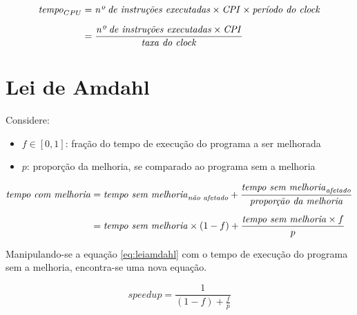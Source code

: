 \documentclass[12pt]{article}
\newcommand{\Text}[1]{\textrm{\textit{#1}}}
\begin{document}
\begin{align} \label{eq:desempenho}
  \Text{tempo}_{CPU}
  &= \Text{nº de instruções executadas} \times \Text{CPI} \times \Text{período do clock} \\[\medskipamount]
  &= \frac{\Text{nº de instruções executadas} \times \Text{CPI}}{\Text{taxa do clock}} \nonumber
\end{align}


\section{Lei de Amdahl}


Considere:
\begin{itemize}
  \item \(f \in [0, 1] \): fração do tempo de execução do programa a ser melhorada
  \item \(p\): proporção da melhoria, se comparado ao programa sem a melhoria
\end{itemize}

\begin{align} \label{eq:leiamdahl}
  \Text{tempo com melhoria}
  &= \Text{tempo sem melhoria}_\Text{não afetado}
  + \frac{\Text{tempo sem melhoria}_\Text{afetado}}{\Text{proporção da melhoria}} \\[\medskipamount]\nonumber
  &= \Text{tempo sem melhoria} \times (1 - f)
  + \frac{\Text{tempo sem melhoria} \times f}{p}
\end{align}

Manipulando-se a equação \ref{eq:leiamdahl} com o tempo de execução do programa sem a melhoria, encontra-se uma nova equação.

\begin{equation} \label{eq:speedupamdahl}
  speedup = \frac{1}{(1 - f) + \frac{f}{p}}
\end{equation}
\end{document}
